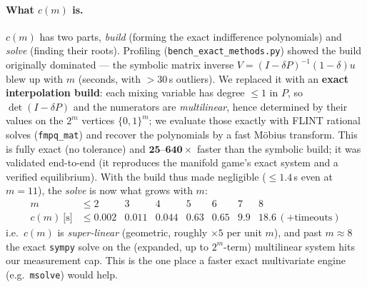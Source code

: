 \documentclass[11pt]{article}
\begin{document}
\paragraph{What $c(m)$ is.} $c(m)$ has two parts, \emph{build} (forming the exact
indifference polynomials) and \emph{solve} (finding their roots). Profiling
(\texttt{bench\_exact\_methods.py}) showed the build originally dominated --- the
symbolic matrix inverse $V=(I-\delta P)^{-1}(1-\delta)u$ blew up with $m$ (seconds,
with $>30$\,s outliers). We replaced it with an \textbf{exact interpolation build}:
each mixing variable has degree $\leq1$ in $P$, so $\det(I-\delta P)$ and the
numerators are \emph{multilinear}, hence determined by their values on the $2^m$
vertices $\{0,1\}^m$; we evaluate those exactly with FLINT rational solves
(\texttt{fmpq\_mat}) and recover the polynomials by a fast M\"obius transform. This is
fully exact (no tolerance) and $\mathbf{25}$--$\mathbf{640\times}$ faster than the
symbolic build; it was validated end-to-end (it reproduces the manifold game's exact
system and a verified equilibrium). With the build thus made negligible
($\leq1.4$\,s even at $m=11$), the \emph{solve} is now what grows with $m$:
\[
\begin{array}{c|cccccccc}
m & \leq2 & 3 & 4 & 5 & 6 & 7 & 8\\\hline
c(m)\ \text{[s]} & \leq0.002 & 0.011 & 0.044 & 0.63 & 0.65 & 9.9 & 18.6\,(+\text{timeouts})
\end{array}
\]
i.e.\ $c(m)$ is \emph{super-linear} (geometric, roughly $\times5$ per unit $m$), and
past $m\approx8$ the exact \texttt{sympy} solve on the (expanded, up to $2^m$-term)
multilinear system hits our measurement cap. This is the one place a faster exact
multivariate engine (e.g.\ \texttt{msolve}) would help.
\end{document}
